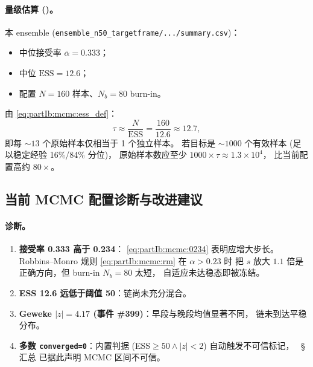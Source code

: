 \paragraph{量级估算 (\StatusReport)。}
本 ensemble (\texttt{ensemble\_n50\_targetframe/.../summary.csv})：
\begin{itemize}[leftmargin=2em]
  \item 中位接受率 $\bar\alpha = 0.333$；
  \item 中位 $\mathrm{ESS} = 12.6$；
  \item 配置 $N=160$ 样本、$N_b=80$ burn-in。
\end{itemize}
由 \eqref{eq:partIb:mcmc:ess_def}：
\begin{equation}
  \tau \approx \frac{N}{\mathrm{ESS}}
       =\frac{160}{12.6}
       \approx 12.7,
  \label{eq:partIb:mcmc:tau_value}
\end{equation}
即每 $\sim 13$ 个原始样本仅相当于 1 个独立样本。
若目标是 $\sim 1000$ 个有效样本 (足以稳定经验 16\%/84\% 分位)，
原始样本数应至少 $1000\times\tau\approx 1.3\times 10^4$，
比当前配置高约 $80\times$。

\subsection{当前 MCMC 配置诊断与改进建议}
\label{sec:partIb:mcmc:diag}

\paragraph{诊断。}
\begin{enumerate}[leftmargin=2em,label=(\arabic*)]
  \item \textbf{接受率 0.333 高于 0.234}：
    \eqref{eq:partIb:mcmc:0234} 表明应增大步长。
    Robbins--Monro 规则 \eqref{eq:partIb:mcmc:rm} 在 $\alpha>0.23$ 时
    把 $s$ 放大 $1.1$ 倍是正确方向，但 burn-in $N_b=80$ 太短，
    自适应未达稳态即被冻结。
  \item \textbf{ESS 12.6 远低于阈值 50}：链尚未充分混合。
  \item \textbf{Geweke $|z|=4.17$ (事件 \#399)}：早段与晚段均值显著不同，
    链未到达平稳分布。
  \item \textbf{多数 \texttt{converged=0}}：内置判据
    (ESS$\geq 50 \wedge |z|<2$) 自动触发不可信标记，
    \StatusReport\ §汇总 已据此声明 MCMC 区间不可信。
\end{enumerate}

